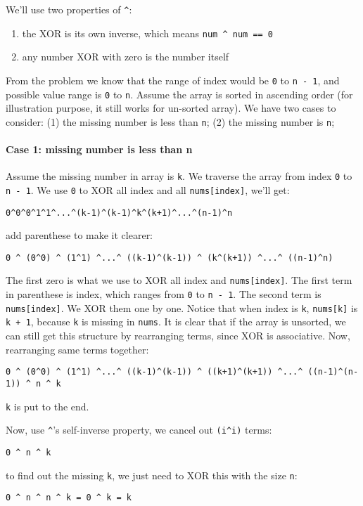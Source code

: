 \documentclass[12pt]{article}
\begin{document}
We'll use two properties of \texttt{\textasciicircum{}}:
\begin{enumerate}
\item the XOR is its own inverse, which means \texttt{num \textasciicircum{} num == 0}
\item any number XOR with zero is the number itself
\end{enumerate}

From the problem we know that the range of index would be \texttt{0} to \texttt{n - 1}, and possible value range is \texttt{0} to \texttt{n}. Assume the array is sorted in ascending order (for illustration purpose, it still works for un-sorted array). We have two cases to consider: (1) the missing number is less than \texttt{n}; (2) the missing number is \texttt{n};
\paragraph{Case 1: missing number is less than n}
\label{sec:orgd3e9ab2}
Assume the missing number in array is \texttt{k}. We traverse the array from index \texttt{0} to \texttt{n - 1}. We use \texttt{0} to XOR all index and all \texttt{nums[index]}, we'll get:
\begin{verbatim}
0^0^0^1^1^...^(k-1)^(k-1)^k^(k+1)^...^(n-1)^n
\end{verbatim}
add parenthese to make it clearer:
\begin{verbatim}
0 ^ (0^0) ^ (1^1) ^...^ ((k-1)^(k-1)) ^ (k^(k+1)) ^...^ ((n-1)^n)
\end{verbatim}
The first zero is what we use to XOR all index and \texttt{nums[index]}. The first term in parenthese is index, which ranges from \texttt{0} to \texttt{n - 1}. The second term is \texttt{nums[index]}. We XOR them one by one. Notice that when index is \texttt{k}, \texttt{nums[k]} is \texttt{k + 1}, because \texttt{k} is missing in \texttt{nums}. It is clear that if the array is unsorted, we can still get this structure by rearranging terms, since XOR is associative. Now, rearranging same terms together:
\begin{verbatim}
0 ^ (0^0) ^ (1^1) ^...^ ((k-1)^(k-1)) ^ ((k+1)^(k+1)) ^...^ ((n-1)^(n-1)) ^ n ^ k
\end{verbatim}
\texttt{k} is put to the end.

Now, use \texttt{\textasciicircum{}}'s self-inverse property, we cancel out \texttt{(i\textasciicircum{}i)} terms:
\begin{verbatim}
0 ^ n ^ k
\end{verbatim}
to find out the missing \texttt{k}, we just need to XOR this with the size \texttt{n}:
\begin{verbatim}
0 ^ n ^ n ^ k = 0 ^ k = k
\end{verbatim}
\end{document}
